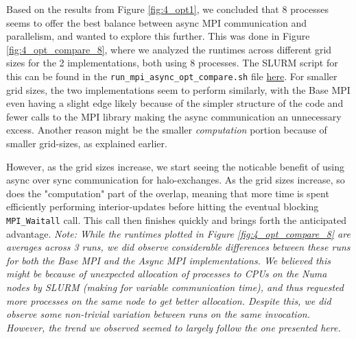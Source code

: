 \documentclass[a4paper,10pt]{article}
\begin{document}
Based on the results from Figure \ref{fig:4_opt1}, we concluded that 8 processes seems to offer the best balance between async MPI communication and parallelism, and wanted to explore this further. This was done in Figure \ref{fig:4_opt_compare_8}, where we analyzed the runtimes across different grid sizes for the 2 implementations, both using 8 processes. The SLURM script for this can be found in the \verb|run_mpi_async_opt_compare.sh| file \href{https://github.com/paulmyr/DD2356-MethodsHPC/blob/master/5_project/4_opt/run_mpi_async_opt_compare.sh}{here}. For smaller grid sizes, the two implementations seem to perform similarly, with the Base MPI even having a slight edge likely because of the simpler structure of the code and fewer calls to the MPI library making the async communication an unnecessary excess. Another reason might be the smaller \textit{computation} portion because of smaller grid-sizes, as explained earlier.


However, as the grid sizes increase, we start seeing the noticable benefit of using async over sync communication for halo-exchanges. As the grid sizes increase, so does the "computation" part of the overlap, meaning that more time is spent efficiently performing interior-updates before hitting the eventual blocking \verb|MPI_Waitall| call. This call then finishes quickly and brings forth the anticipated advantage.
\textit{Note: While the runtimes plotted in Figure \ref{fig:4_opt_compare_8} are averages across 3 runs, we did observe considerable differences between these runs for both the Base MPI and the Async MPI implementations. We believed this might be because of unexpected allocation of processes to CPUs on the Numa nodes by SLURM (making for variable communication time), and thus requested more processes on the same node to get better allocation. Despite this, we did observe some non-trivial variation between runs on the same invocation. However, the trend we observed seemed to largely follow the one presented here.}
\end{document}
